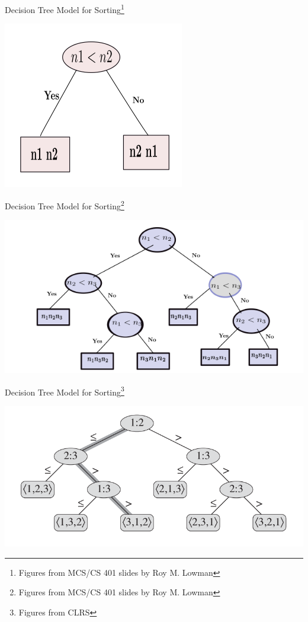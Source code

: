 \documentclass{beamer}
\begin{document}
\begin{frame}{Decision Tree Model for Sorting\footnote{Figures from MCS/CS 401 slides by Roy M. Lowman}}
\begin{center}
    \includegraphics[scale=0.5]{sortingDTree2Elems.png}
\end{center}
\end{frame}

\begin{frame}{Decision Tree Model for Sorting\footnote{Figures from MCS/CS 401 slides by Roy M. Lowman}}
\begin{center}
    \includegraphics[scale=0.5]{sortingDTree3Elems.png}
\end{center}
\end{frame}


\begin{frame}{Decision Tree Model for Sorting\footnote{Figures from CLRS}}
\begin{center}
    \includegraphics[scale=0.36]{sortingDTree3ElemsCLRS.png}
\end{center}
\end{frame}
\end{document}
